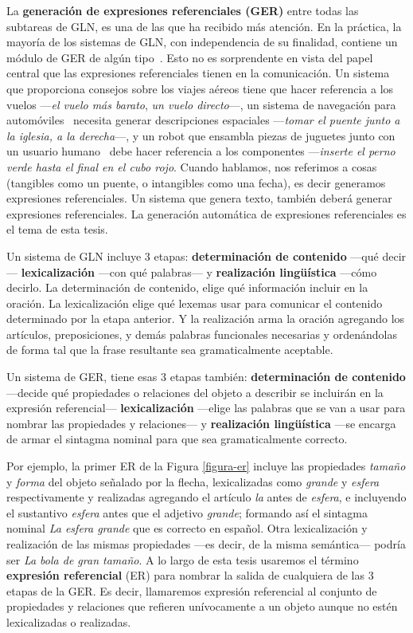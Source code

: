 La \textbf {generaci\'on de expresiones referenciales (GER)} entre todas las subtareas de GLN, es una de las que ha recibido m\'as atenci\'on. En la pr\'actica, la mayor\'ia de los sistemas de GLN, con independencia de su finalidad, contiene un m\'odulo de GER de alg\'un tipo~\cite{Mellish2004}. Esto no es sorprendente
en vista del papel central que las expresiones referenciales tienen en la comunicaci\'on. Un sistema que proporciona
consejos sobre los viajes a\'ereos \cite{white2010generating} tiene que hacer referencia a los vuelos ---{\it el vuelo m\'as barato}, {\it un vuelo directo}---, un sistema de navegaci\'on para autom\'oviles~\cite{Drager:2012:GLN:2380816.2380908}
necesita generar descripciones espaciales ---{\it tomar el puente junto a la iglesia, a la derecha}---,
y un robot que ensambla piezas de juguetes junto con un usuario humano~\cite{foster-etal-ijcai2009} debe hacer referencia a los componentes ---{\it inserte el perno verde hasta el final en el cubo rojo}. Cuando hablamos, nos referimos a cosas (tangibles como un puente, o intangibles como una fecha), es decir generamos expresiones referenciales. Un sistema que genera texto, tambi\'en deber\'a generar expresiones referenciales. La generaci\'on autom\'atica de expresiones referenciales es el tema de esta tesis.

Un sistema de GLN incluye 3 etapas: {\bf determinaci\'on de contenido} ---qu\'e decir--- {\bf lexicalizaci\'on} ---con qu\'e palabras--- y {\bf realizaci\'on ling\"{u}\'istica} ---c\'omo decirlo. La determinaci\'on de contenido, elige qu\'e informaci\'on incluir en la oraci\'on. La lexicalizaci\'on elige qu\'e lexemas usar para comunicar el contenido determinado por la etapa anterior. Y la realizaci\'on arma la oraci\'on agregando los art\'iculos, preposiciones, y dem\'as palabras funcionales necesarias y orden\'andolas de forma tal que la frase resultante sea gramaticalmente aceptable. 

Un sistema de GER, tiene esas 3 etapas tambi\'en: {\bf determinaci\'on de contenido} ---decide qu\'e propiedades o relaciones del objeto a describir se incluir\'an en la expresi\'on referencial--- {\bf lexicalizaci\'on} ---elige las palabras que se van a usar para nombrar las propiedades y relaciones--- y {\bf realizaci\'on ling\"u\'istica} ---se encarga de armar el sintagma nominal para que sea gramaticalmente correcto.

Por ejemplo, la primer ER de la Figura \ref{figura-er} incluye las propiedades {\it tama\~no} y {\it forma} del objeto se\~nalado por la flecha, lexicalizadas como {\it grande} y {\it esfera} respectivamente y realizadas agregando el art\'iculo {\it la} antes de {\it esfera}, e incluyendo el sustantivo {\it esfera} antes que el adjetivo {\it grande}; formando as\'i el sintagma nominal {\it La esfera grande} que es correcto en espa\~nol. Otra lexicalizaci\'on y realizaci\'on de las mismas propiedades ---es decir, de la misma sem\'antica--- podr\'ia ser {\it La bola de gran tama\~no}. A lo largo de esta tesis usaremos el t\'ermino {\bf expresi\'on referencial} (ER) para nombrar la salida de cualquiera de las 3 etapas de la GER. Es decir, llamaremos expresi\'on referencial al conjunto de propiedades y relaciones que refieren un\'ivocamente a un objeto aunque no est\'en lexicalizadas o realizadas.

